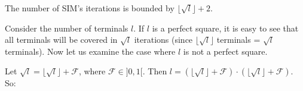 \begin{Lem}
  \label{lem:number_iterations}
  The number of SIM's iterations is bounded by $\lfloor\sqrt{l}\rfloor + 2$.
\end{Lem}
  \begin{Proof}

Consider the number of terminals $l$. If $l$ is a perfect square, it is easy to see that all terminals will be covered in $\sqrt{l}$ iterations (since $\lfloor\sqrt{l}\rfloor$ terminals = $\sqrt{l}$ terminals). 
Now let us examine the case where $l$ is not a perfect square.

Let $\sqrt{l} = \lfloor\sqrt{l}\rfloor + \mathcal{F}$, where $\mathcal{F} \in ]0,1[$. Then $l = (\lfloor\sqrt{l}\rfloor + \mathcal{F}) \cdot (\lfloor\sqrt{l}\rfloor + \mathcal{F})$. So:


\end{Proof}
